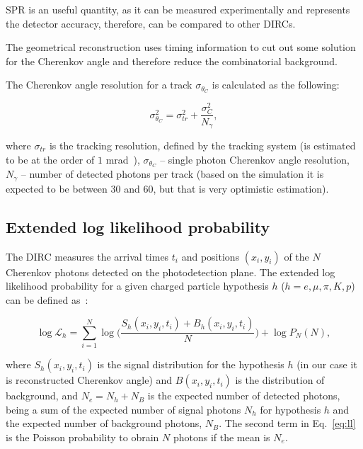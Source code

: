 \documentclass[11pt, a4paper]{article}
\begin{document}
SPR is an useful quantity, as it can be measured experimentally and represents the detector accuracy, therefore, can be compared to other DIRCs.

The geometrical reconstruction uses timing information to cut out some solution for the Cherenkov angle and therefore reduce the combinatorial background.

The Cherenkov angle resolution for a track $\sigma_{\theta_{C}}$ is calculated as the following:

\begin{equation}
\sigma^{2}_{\theta_{C}} = \sigma^{2}_{tr} + \frac{\sigma^{2}_{C}}{N_{\gamma}},
\end{equation}

\noindent where $\sigma_{tr}$ is the tracking resolution, defined by the tracking system (is estimated to be at the order of $1$ mrad~\cite{tdr}), $\sigma_{\theta_{C}}$ -- single photon Cherenkov angle resolution, $N_{\gamma}$ -- number of detected photons per track (based on the simulation it is expected to be between 30 and 60, but that is very optimistic estimation).

\subsection{Extended log likelihood probability}

The DIRC measures the arrival times $t_{i}$ and positions $(x_{i}, y_{i})$ of the $N$ Cherenkov photons detected on the photodetection plane. The extended log likelihood probability for a given charged particle hypothesis $h$ 
($h = e, \mu, \pi, K, p$) can be 
defined as~\cite{staric2}:

\begin{equation}
\log\mathcal{L}_{h} = \sum_{i=1}^{N} \log \Big( \frac{S_{h}(x_{i}, y_{i}, t_{i}) + B_{h}(x_{i}, y_{i}, t_{i})}{N} \Big) + \log P_{N}(N),
\label{eq:ll}
\end{equation}

\noindent where $S_{h} (x_{i}, y_{i}, t_{i})$ is the signal distribution for the hypothesis $h$ (in our case it is reconstructed Cherenkov angle) and $B(x_{i}, y_{i}, t_{i})$ is the distribution of background, and $N_{e} = N_{h} + N_{B}$ is the expected number of detected photons, being a sum of the expected number of signal photons $N_{h}$ for hypothesis $h$ and the expected number of background photons, $N_{B}$. The second term in Eq.~\ref{eq:ll} is the Poisson probability to obrain $N$ photons if the mean is $N_{e}$.
\end{document}
